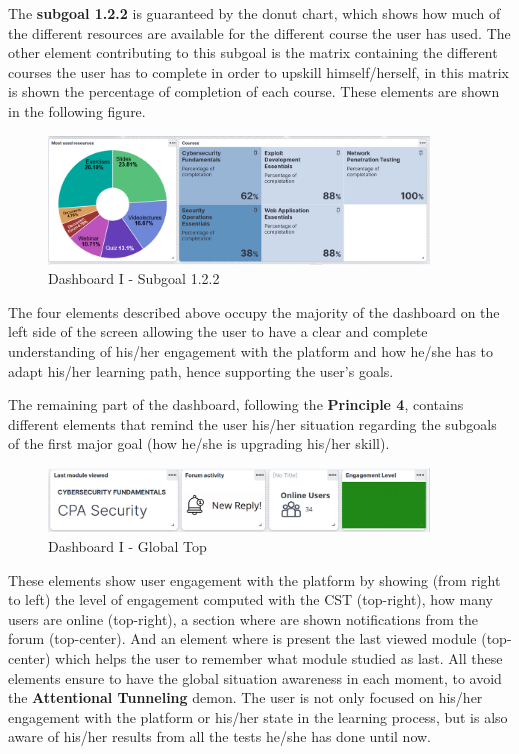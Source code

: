 The \textbf{subgoal 1.2.2} is guaranteed by the donut chart, which shows how much
of the different resources are available for the different course the user has
used. The other element contributing to this subgoal is the matrix containing
the different courses the user has to complete in order to upskill himself/herself,
in this matrix is shown the percentage of completion of each course. These elements
are shown in the following figure.

\begin{figure}[H]
    \centering
    \includegraphics[width=0.9\textwidth]{assets/dashboard_1_122.png}
    \caption{Dashboard I - Subgoal 1.2.2}
    \label{fig:dashboard_1_subgoal_122}
\end{figure}

The four elements described above occupy the majority of the dashboard on 
the left side of the screen allowing the user to have a clear and complete
understanding of his/her engagement with the platform and how he/she has to
adapt his/her learning path, hence supporting the user's goals. 

The remaining part of the dashboard, following the
\textbf{Principle 4}, contains different elements that remind the user his/her
situation regarding the subgoals of the first major goal (how he/she is upgrading 
his/her skill). 

\begin{figure}[H]
    \centering
    \includegraphics[width=0.9\textwidth]{assets/dashboard_1_globaltop.png}
    \caption{Dashboard I - Global Top}
    \label{fig:dashboard_1_global_top}
\end{figure}

These elements show user engagement with the platform by showing (from right to left)
the level of engagement computed with the CST (top-right),
how many users are online (top-right), a section
where are shown notifications from the forum (top-center). 
And an element where is present the last viewed module (top-center) which helps the user
to remember what module studied as last.
All these elements ensure to have the global situation awareness in each moment, 
to avoid the \textbf{Attentional Tunneling} demon. The user is not only focused
on his/her engagement with the platform or his/her state in the learning process, but is
also aware of his/her results from all the tests he/she has done until now.


